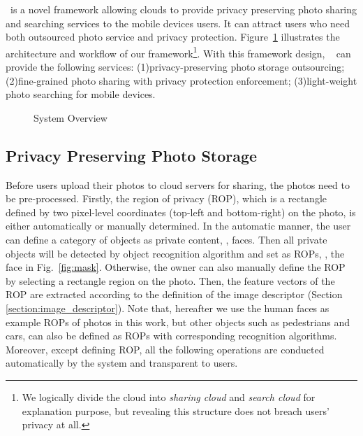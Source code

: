 \ourprotocolNSP~is a novel framework allowing clouds to provide privacy preserving photo sharing and searching services to the mobile devices users.
It can attract users who need both outsourced photo service and privacy protection.
Figure~\ref{fig:system_overview} illustrates the architecture and workflow of our framework\footnote[2]{We
  logically divide the cloud into \textit{sharing cloud} and
  \textit{search cloud} for explanation purpose, but revealing
  this structure does not breach users' privacy at
  all.}. With this framework design, \ourprotocolNSP~ can provide the following services:
  (1)privacy-preserving photo storage outsourcing;
  (2)fine-grained photo sharing with privacy protection enforcement;
  (3)light-weight photo searching for mobile devices.
\begin{figure}[h]
  \centering
  \vspace{-5pt}
  \caption{\ourprotocol System Overview}\vspace{-10pt}
  \label{fig:system_overview}
\end{figure}













\vspace{-0.05in}
\subsection{Privacy Preserving Photo Storage}\label{sec:privacy_storage}
\vspace{-0.05in}

Before users upload their photos to cloud
servers for sharing, the photos need to be pre-processed.
Firstly, the region of privacy (ROP), which is a rectangle defined by two pixel-level
coordinates (top-left and bottom-right) on the photo, is either automatically or manually determined.
In the automatic manner, the user can define a category of objects as private content, \eg, faces.
Then all private objects will be detected by object recognition algorithm and set as ROPs, \eg, the face in Fig.~\ref{fig:mask}.
Otherwise, the owner can also manually define the ROP by selecting a rectangle region on the photo.
Then, the feature vectors of the ROP are extracted according to the
definition of the image descriptor (Section \ref{section:image_descriptor}).
Note that, hereafter we use the human faces as example ROPs of photos in this work,
 but other objects such as pedestrians and cars, can also be defined as ROPs with
corresponding recognition algorithms.
Moreover, except defining ROP, all the following operations are conducted automatically
by the system and transparent to users.



